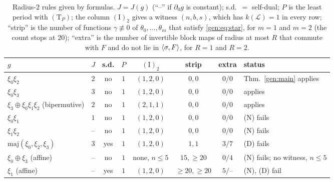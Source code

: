 \begin{table}[ht]
\caption{Radius-$2$ rules given by formulas. $J=J(g)$ (``--'' if $\partial_0g$ is constant); s.d.\ $=$ self-dual; $P$ is the least period with $(\mathrm T_P)$; the column $(\mathrm I)_2$ gives a witness $(n,b,s)$, which has $k(\mathcal L)=1$ in every row; ``strip'' is the number of functions $\gamma\not\equiv0$ of $\theta_0,\dots,\theta_m$ that satisfy \eqref{gen:eq:star}, for $m=1$ and $m=2$ (the count stops at $20$); ``extra'' is the number of invertible block maps of radius at most $R$ that commute with $F$ and do not lie in $\langle\sigma,F\rangle$, for $R=1$ and $R=2$.}
\label{gen:tab:r2}
\centering
\small
\begin{tabular}{lcccccc l}
\toprule
$g$ & $J$ & s.d. & $P$ & $(\mathrm I)_2$ & strip & extra & status\\
\midrule
$\xi_0\xi_2$ & $2$ & no & $1$ & $(1,2,0)$ & $0,0$ & $0/0$ & Thm.~\ref{gen:main} applies\\
$\xi_0\xi_3$ & $3$ & no & $1$ & $(1,2,0)$ & $0,0$ & $0/0$ & applies\\
$\xi_3\oplus\xi_0\xi_1\xi_2$ (bipermutive) & $2$ & no & $1$ & $(2,1,1)$ & $0,0$ & $0/0$ & applies\\
\midrule
$\xi_0\xi_1$ & $1$ & no & $1$ & $(1,2,0)$ & $0,0$ & $0/0$ & (N) fails\\
$\xi_1\xi_2$ & -- & no & $1$ & $(1,2,0)$ & $0,0$ & $0/0$ & (N) fails\\
$\mathrm{maj}(\xi_0,\xi_2,\xi_3)$ & $3$ & yes & $1$ & $(1,2,0)$ & $1,1$ & $3/7$ & (D) fails\\
$\xi_0\oplus\xi_3$ (affine) & -- & no & $1$ & none, $n\le5$ & $15,{\ge}20$ & $0/4$ & (N) fails; no witness, $n\le5$\\
$\xi_1$ (affine) & -- & yes & $1$ & $(1,2,0)$ & ${\ge}20,{\ge}20$ & $5/$-- & (N), (D) fail\\
\bottomrule
\end{tabular}
\end{table}

